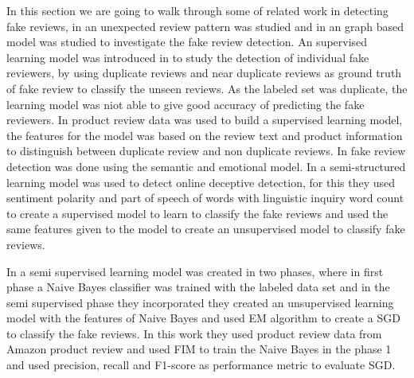 \documentclass[sigconf]{acmart}
\begin{document}
In this section we are going to walk through some of related work in detecting fake reviews, in \cite{1} an unexpected review pattern was studied and in \cite{} an graph based model was studied to investigate the fake review detection. An supervised learning model was introduced in \cite{2} to study the detection of individual fake reviewers, by using duplicate reviews and near duplicate reviews as ground truth of fake review to classify the unseen reviews. As the labeled set was duplicate, the learning model was niot able to give good accuracy of predicting the fake reviewers. In \cite{1} product review data was used to build a supervised learning model, the features for the model was based on the review text and product information to distinguish between duplicate review and non duplicate reviews. In \cite{http://ieeexplore.ieee.org.proxyiub.uits.iu.edu/document/7726174/} fake review detection was done using the semantic and emotional model. In \cite{http://ieeexplore.ieee.org.proxyiub.uits.iu.edu/document/7822945/} a semi-structured learning model was used to detect online deceptive detection, for this they used sentiment polarity and part of speech of words with linguistic inquiry word count  to create a supervised model to learn to classify the fake reviews and used the same features given to the model to create an unsupervised model to classify fake reviews.

In \cite{http://ieeexplore.ieee.org.proxyiub.uits.iu.edu/stamp/stamp.jsp?tp=&arnumber=8026965} a semi supervised learning model was created in two phases, where in first phase a Naive Bayes classifier was trained with the labeled data set and in the semi supervised phase they incorporated they created an unsupervised learning model with the features of Naive Bayes and used EM algorithm to create a SGD to classify the fake reviews.  In this work they used product review data from Amazon product review and used FIM \cite{http://ieeexplore.ieee.org.proxyiub.uits.iu.edu/stamp/stamp.jsp?tp=&arnumber=8026965} to train the Naive Bayes in the phase 1 and used precision, recall and F1-score as performance metric to evaluate SGD.
\end{document}
